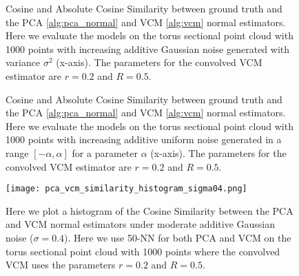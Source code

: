 \documentclass{article}
\begin{document}
\begin{figure}

  \centering
    \qquad
    \caption{Cosine and Absolute Cosine Similarity between ground truth and the PCA \eqref{alg:pca_normal} and VCM \eqref{alg:vcm} normal estimators. Here we evaluate the models on the torus sectional point cloud with 1000 points with increasing additive Gaussian noise generated with variance $\sigma^2$ (x-axis). The parameters for the convolved VCM estimator are $r=0.2$ and $R=0.5$. }%
\label{fig:pca_vcm_gaussian_cosine_torus_sectional}
\end{figure}



\begin{figure}

  \centering
    \qquad
    \caption{Cosine and Absolute Cosine Similarity between ground truth and the PCA \eqref{alg:pca_normal} and VCM \eqref{alg:vcm} normal estimators. Here we evaluate the models on the torus sectional point cloud with 1000 points with increasing additive uniform noise generated in a range $[-\alpha, \alpha]$ for a parameter $\alpha$ (x-axis). The parameters for the convolved VCM estimator are $r=0.2$ and $R=0.5$. }%
\label{fig:pca_vcm_uniform_cosine_torus_sectional}
\end{figure}

\begin{figure}
    \centering
    \texttt{[image: pca\_vcm\_similarity\_histogram\_sigma04.png]}
    \caption{Here we plot a histogram of the Cosine Similarity between the PCA and VCM normal estimators under moderate additive Gaussian noise ($\sigma = 0.4$). Here we use 50-NN for both PCA and VCM on the torus sectional point cloud with 1000 points where the convolved VCM uses the parameters $r=0.2$ and $R=0.5$.}
    \label{fig:pca_vcm_similarity_histogram_sigma04}
\end{figure}
\end{document}
